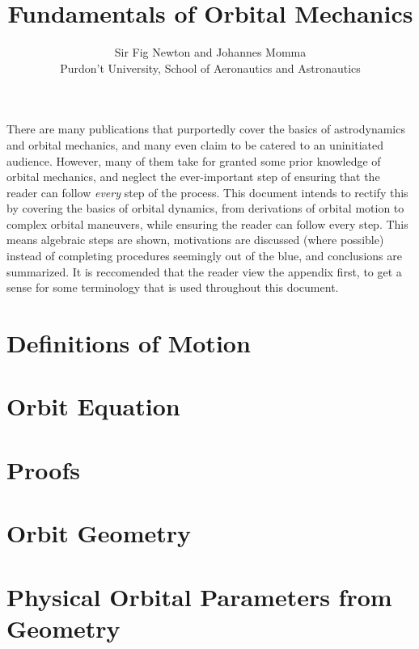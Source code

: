 \documentclass{article}
\title{Fundamentals of Orbital Mechanics}
\author{Sir Fig Newton and Johannes Momma\\Purdon't University, School of Aeronautics and Astronautics}
\date{}
\begin{document}
\maketitle

There are many publications that purportedly cover the basics of astrodynamics and orbital mechanics, and many even claim to be catered to an uninitiated audience. However, many of them take for granted some prior knowledge of orbital mechanics, and neglect the ever-important step of ensuring that the reader can follow \textit{every} step of the process. This document intends to rectify this by covering the basics of orbital dynamics, from derivations of orbital motion to complex orbital maneuvers, while ensuring the reader can follow every step. This means algebraic steps are shown, motivations are discussed (where possible) instead of completing procedures seemingly out of the blue, and conclusions are summarized. It is reccomended that the reader view the appendix first, to get a sense for some terminology that is used throughout this document.

\pagebreak
\tableofcontents

\pagebreak
\section{Definitions of Motion}\label{Sec:Motion}


\pagebreak
\section{Orbit Equation}\label{Sec:Orbit Equation}


\pagebreak
\section{Proofs}\label{sec:Proofs}


\pagebreak
\section{Orbit Geometry}\label{sec:Orbit Geometry}


\pagebreak
\section{Physical Orbital Parameters from Geometry}\label{sec:Orbital Parameters from Geometry}

\end{document}
